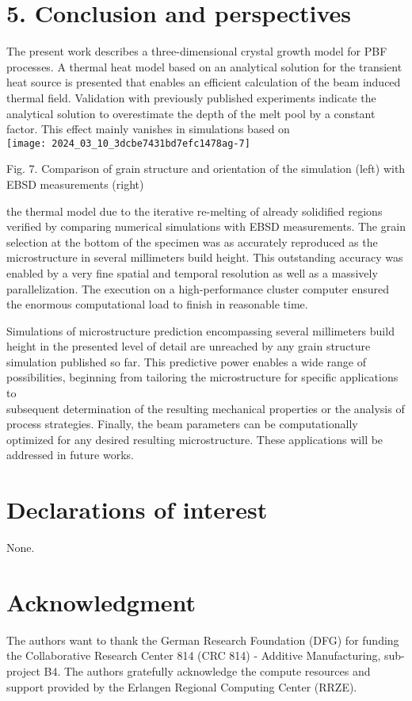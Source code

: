 \documentclass[10pt]{article}
\begin{document}
\section*{5. Conclusion and perspectives}
The present work describes a three-dimensional crystal growth model for PBF processes. A thermal heat model based on an analytical solution for the transient heat source is presented that enables an efficient calculation of the beam induced thermal field. Validation with previously published experiments indicate the analytical solution to overestimate the depth of the melt pool by a constant factor. This effect mainly vanishes in simulations based on\\
\texttt{[image: 2024\_03\_10\_3dcbe7431bd7efc1478ag-7]}

Fig. 7. Comparison of grain structure and orientation of the simulation (left) with EBSD measurements (right)

the thermal model due to the iterative re-melting of already solidified regions verified by comparing numerical simulations with EBSD measurements. The grain selection at the bottom of the specimen was as accurately reproduced as the microstructure in several millimeters build height. This outstanding accuracy was enabled by a very fine spatial and temporal resolution as well as a massively parallelization. The execution on a high-performance cluster computer ensured the enormous computational load to finish in reasonable time.

Simulations of microstructure prediction encompassing several millimeters build height in the presented level of detail are unreached by any grain structure simulation published so far. This predictive power enables a wide range of possibilities, beginning from tailoring the microstructure for specific applications to\\
subsequent determination of the resulting mechanical properties or the analysis of process strategies. Finally, the beam parameters can be computationally optimized for any desired resulting microstructure. These applications will be addressed in future works.

\section*{Declarations of interest}
None.

\section*{Acknowledgment}
The authors want to thank the German Research Foundation (DFG) for funding the Collaborative Research Center 814 (CRC 814) - Additive Manufacturing, sub-project B4. The authors gratefully acknowledge the compute resources and support provided by the Erlangen Regional Computing Center (RRZE).
\end{document}
